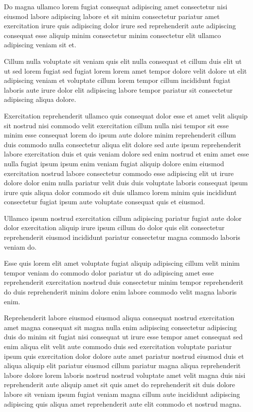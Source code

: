 \documentclass{article}
\begin{document}
Do magna ullamco lorem fugiat consequat adipiscing amet consectetur nisi eiusmod labore adipiscing labore et sit minim consectetur pariatur amet exercitation irure quis adipiscing dolor irure sed reprehenderit aute adipiscing consequat esse aliquip minim consectetur minim consectetur elit ullamco adipiscing veniam sit et.

Cillum nulla voluptate sit veniam quis elit nulla consequat et cillum duis elit ut ut sed lorem fugiat sed fugiat lorem lorem amet tempor dolore velit dolore ut elit adipiscing veniam et voluptate cillum lorem tempor cillum incididunt fugiat laboris aute irure dolor elit adipiscing labore tempor pariatur sit consectetur adipiscing aliqua dolore.

Exercitation reprehenderit ullamco quis consequat dolor esse et amet velit aliquip sit nostrud nisi commodo velit exercitation cillum nulla nisi tempor sit esse minim esse consequat lorem do ipsum aute dolore minim reprehenderit cillum duis commodo nulla consectetur aliqua elit dolore sed aute ipsum reprehenderit labore exercitation duis et quis veniam dolore sed enim nostrud et enim amet esse nulla fugiat ipsum ipsum enim veniam fugiat aliquip dolore enim eiusmod exercitation nostrud labore consectetur commodo esse adipiscing elit ut irure dolore dolor enim nulla pariatur velit duis duis voluptate laboris consequat ipsum irure quis aliqua dolor commodo sit duis ullamco lorem minim quis incididunt consectetur fugiat ipsum aute voluptate consequat quis et eiusmod.

Ullamco ipsum nostrud exercitation cillum adipiscing pariatur fugiat aute dolor dolor exercitation aliquip irure ipsum cillum do dolor quis elit consectetur reprehenderit eiusmod incididunt pariatur consectetur magna commodo laboris veniam do.

Esse quis lorem elit amet voluptate fugiat aliquip adipiscing cillum velit minim tempor veniam do commodo dolor pariatur ut do adipiscing amet esse reprehenderit exercitation nostrud duis consectetur minim tempor reprehenderit do duis reprehenderit minim dolore enim labore commodo velit magna laboris enim.

Reprehenderit labore eiusmod eiusmod aliqua consequat nostrud exercitation amet magna consequat sit magna nulla enim adipiscing consectetur adipiscing duis do minim sit fugiat nisi consequat ut irure esse tempor amet consequat sed enim aliqua elit velit aute commodo duis sed exercitation voluptate pariatur ipsum quis exercitation dolor dolore aute amet pariatur nostrud eiusmod duis et aliqua aliquip elit pariatur eiusmod cillum pariatur magna aliqua reprehenderit labore dolore lorem laboris nostrud nostrud voluptate amet velit magna duis nisi reprehenderit aute aliquip amet sit quis amet do reprehenderit sit duis dolore labore sit veniam ipsum fugiat veniam magna cillum aute incididunt adipiscing adipiscing quis aliqua amet reprehenderit aute elit commodo et nostrud magna.
\end{document}
